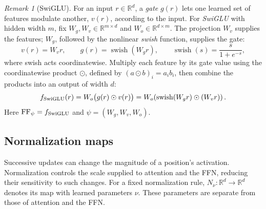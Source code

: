 \documentclass[11pt,twoside]{article}
\newcommand{\R}{\mathbb R}
\theoremstyle{plain}
\theoremstyle{definition}
\theoremstyle{remark}
\newtheorem{remark}{Remark}[section]
\begin{document}
\begin{remark}[SwiGLU]
\label{rem:swiglu}
For an input $r\in\R^d$, a \emph{gate} $g(r)$ lets one learned set of features
modulate another, $v(r)$, according to the input.
For \emph{SwiGLU} with hidden width $m$, fix $W_g,W_v\in\R^{m\times d}$ and
$W_o\in\R^{d\times m}$. The projection $W_v$ supplies the features;
$W_g$, followed by the nonlinear \emph{swish} function, supplies the gate:
\[
v(r)=W_vr,\qquad g(r)=\operatorname{swish}(W_gr),\qquad
\operatorname{swish}(s)=\frac{s}{1+e^{-s}},
\]
where swish acts coordinatewise. Multiply each feature by its gate value
using the coordinatewise product $\odot$, defined by $(a\odot b)_i=a_i b_i$,
then combine the products into an output of width $d$:
\begin{equation}
f_{\rm SwiGLU}(r)
=W_o\bigl(g(r)\odot v(r)\bigr)
=W_o\!\left(
\operatorname{swish}(W_g r)\odot (W_v r)
\right).
\end{equation}
Here
$\operatorname{FF}_\psi=f_{\rm SwiGLU}$ and $\psi=(W_g,W_v,W_o)$.
\end{remark}

\subsection{Normalization maps}
\label{sec:normalization-maps}

Successive updates can change the magnitude of a position's activation.
Normalization controls the scale supplied to attention and the FFN, reducing
their sensitivity to such changes.
For a fixed normalization rule, $N_\nu:\R^d\to\R^d$ denotes its map with
learned parameters $\nu$. These parameters are separate from those of
attention and the FFN.
\end{document}
